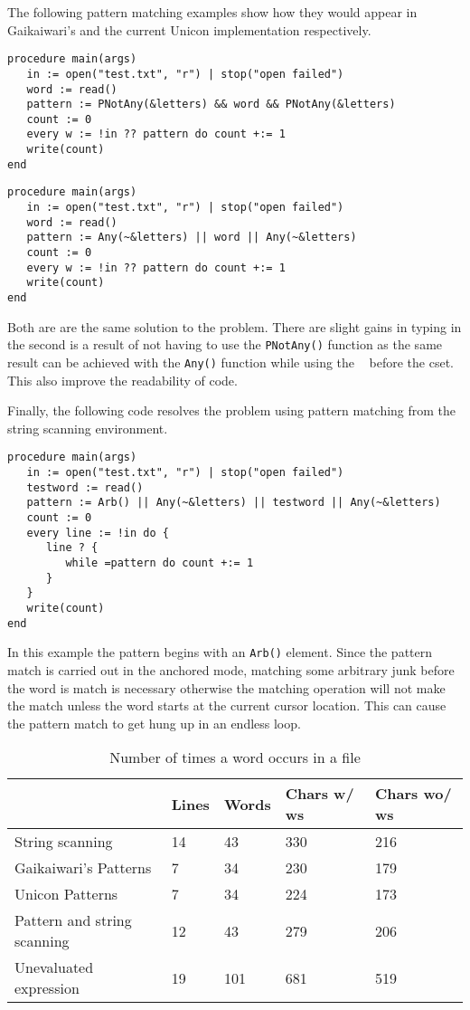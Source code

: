 \documentclass{article}
\begin{document}
The following pattern matching examples show how they would appear in Gaikaiwari's and the current Unicon implementation respectively.
\begin{verbatim}
procedure main(args)
   in := open("test.txt", "r") | stop("open failed")
   word := read()
   pattern := PNotAny(&letters) && word && PNotAny(&letters)
   count := 0
   every w := !in ?? pattern do count +:= 1
   write(count)
end
\end{verbatim}

\begin{verbatim}
procedure main(args)
   in := open("test.txt", "r") | stop("open failed")
   word := read()
   pattern := Any(~&letters) || word || Any(~&letters)
   count := 0
   every w := !in ?? pattern do count +:= 1
   write(count)
end
\end{verbatim}
Both are are the same solution to the problem.  There are slight gains in typing in the second is a result of not having to use the \texttt{PNotAny()} function as the same result can be achieved with the \texttt{Any()} function while using the \texttt{~} before the cset.  This also improve the readability of code.

Finally, the following code resolves the problem using pattern matching from the string scanning environment.
\begin{verbatim}
procedure main(args)
   in := open("test.txt", "r") | stop("open failed")
   testword := read()
   pattern := Arb() || Any(~&letters) || testword || Any(~&letters)
   count := 0
   every line := !in do {
      line ? {
         while =pattern do count +:= 1
      }
   }
   write(count)
end
\end{verbatim}
In this example the pattern begins with an \texttt{Arb()} element.  Since the pattern match is carried out in the anchored mode, matching some arbitrary junk before the word is match is necessary otherwise the matching operation will not make the match unless the word starts at the current cursor location.  This can cause the pattern match to get hung up in an endless loop.

\begin{table}[ht]
	\caption{Number of times a word occurs in a file}
	\centering
	\begin{tabular}{|l|l|l|l|l|}
		\hline\hline
		 & Lines & Words & Chars w/ ws & Chars wo/ ws\\
		\hline
		String scanning & 14 & 43 & 330 & 216 \\
		Gaikaiwari's Patterns & 7 & 34 & 230 & 179 \\
		Unicon Patterns & 7 & 34 & 224 & 173 \\
		Pattern and string scanning & 12 & 43 & 279 & 206 \\
		Unevaluated expression & 19 & 101 & 681 & 519 \\
		\hline
	\end{tabular}
\end{table}
\end{document}
